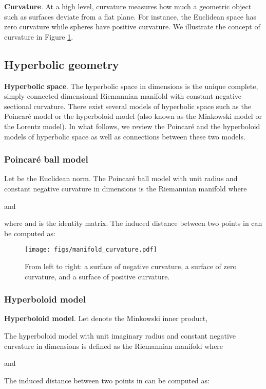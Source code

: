 \documentclass{article}
\newcommand{\xhdr}[1]{{\noindent\bfseries #1}.}
\begin{document}
\xhdr{Curvature}
At a high level, curvature measures how much a geometric object such as surfaces deviate from a flat plane. 
For instance, the Euclidean space has zero curvature while spheres have positive curvature. 
We illustrate the concept of curvature in Figure \ref{fig:manifold_curvature}.

\subsection{Hyperbolic geometry}
\xhdr{Hyperbolic space} The hyperbolic space in  dimensions is the unique complete, simply connected dimensional Riemannian manifold with constant negative sectional curvature.
There exist several models of hyperbolic space such as the Poincar\'e model or the hyperboloid model (also known as the Minkowski model or the Lorentz model).
In what follows, we review the Poincar\'e and the hyperboloid models of hyperbolic space as well as connections between these two models. 

\subsubsection{Poincar\'e ball model}
Let  be the Euclidean norm. 
The Poincar\'e ball model with unit radius and constant negative curvature  in  dimensions is the Riemannian manifold  where

and

where  and  is the identity matrix.  
The induced distance between two points  in  can be computed as:


\begin{figure}[t]
\begin{center}
    \texttt{[image: figs/manifold\_curvature.pdf]}
  \end{center}
\caption{From left to right: a surface of negative curvature, a surface of zero curvature, and a surface of positive curvature.}
  \label{fig:manifold_curvature}
\end{figure}
\subsubsection{Hyperboloid model}
\xhdr{Hyperboloid model}
Let  denote the Minkowski inner product,

The hyperboloid model with unit imaginary radius and constant negative curvature  in  dimensions is defined as the Riemannian manifold  where

and
\begin{small}

\end{small}
The induced distance between two points  in  can be computed as:
\end{document}
